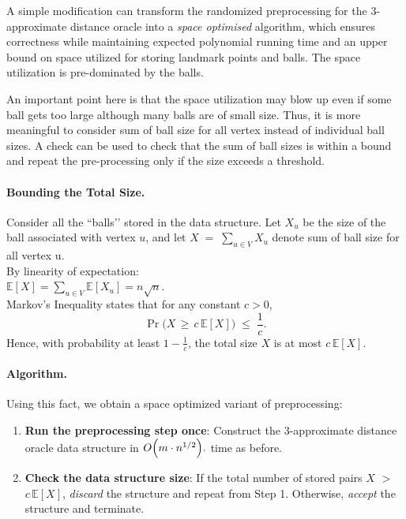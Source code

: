 \documentclass{article}
\begin{document}
A simple modification can transform the randomized preprocessing for the 3-approximate distance oracle into a \emph{space optimised} algorithm, which ensures correctness while maintaining expected polynomial running time and an upper bound on space utilized for storing landmark points and balls. The space utilization is pre-dominated by the balls.

An important point here is that the space utilization may blow up even if some ball gets too large although many balls are of small size. Thus, it is more meaningful to consider sum of ball size for all vertex instead of individual ball sizes. A check can be used to check that the sum of ball sizes is within a bound and repeat the pre-processing only if the size exceeds a threshold.

\paragraph{Bounding the Total Size.}
Consider all the ``balls’’ stored in the data structure. Let \(X_u\) be the size of the ball associated with vertex \(u\), and let \(
X \;=\; \sum_{u \in V} X_u \) denote sum of ball size for all vertex u.\\
By linearity of expectation: \\\(\mathbb{E}[X] = \sum_{u \in V} \mathbb{E}[X_u] = n\sqrt{n}\). \\
Markov’s Inequality states that for any constant \(c > 0\),
\[
\Pr\bigl(X \,\ge\, c\,\mathbb{E}[X]\bigr) \;\le\; \frac{1}{c}.
\]
Hence, with probability at least \(\!\!1 - \frac{1}{c}\), the total size \(X\) is at most \(c\,\mathbb{E}[X]\).

\paragraph{Algorithm.}
Using this fact, we obtain a space optimized variant of preprocessing:
\begin{enumerate}
    \item \textbf{Run the preprocessing step once}: Construct the 3-approximate distance oracle data structure in \(
O\Bigl(m \cdot n^{1/2}\Bigr).
\) time as before.
    \item \textbf{Check the data structure size}: If the total number of stored pairs \(\ensuremath{X}\) \(>\) \(c\,\ensuremath{\mathbb{E}[X]}\), \emph{discard} the structure and repeat from Step 1. Otherwise, \emph{accept} the structure and terminate.
\end{enumerate}
\end{document}
